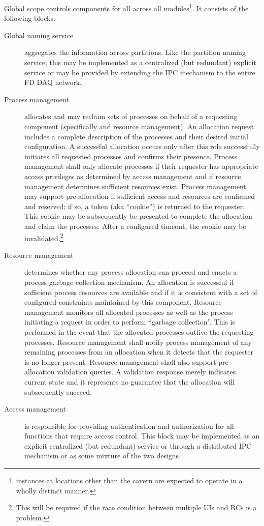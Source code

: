 Global scope controls  components for all  across all  modules\footnote{ instances at locations other than the  cavern are expected to operate in a wholly distinct manner.}.  It consists of the following blocks:


\begin{description}
\item[Global naming service] aggregates the  information across partitions.  Like the partition naming service, this may be implemented as a centralized (but redundant) explicit service or may be provided by extending the IPC  mechanism to the entire FD DAQ network.

\item[Process management] allocates and may reclaim sets of processes on behalf of a requesting component (specifically  and resource management). 
  An allocation request includes a complete description of the processes and their desired initial configuration. 
  A successful allocation occurs only after this role successfully initiates all requested processes and confirms their presence. 
  Process management shall only allocate processes if their requester has appropriate access privileges as determined by access management and if resource management determines sufficient resources exist. 
  Process management may support pre-allocation if sufficient access and resources are confirmed and reserved; if so, a token (aka ``cookie'') is returned to the requester. 
  This cookie may be subsequently be presented to complete the allocation and claim the processes. 
  After a configured timeout, the cookie may be invalidated.\footnote{This will be required if the race condition between multiple UIs and RCs is a problem.}  
  
\item[Resource management] determines whether any process allocation can proceed and enacts a process garbage collection mechanism. 
  An allocation is successful if sufficient process resources are available and if it is consistent with a set of configured constraints maintained by this component. 
  Resource management monitors all allocated processes as well as the process initiating a request in order to perform ``garbage collection''. 
  This is performed in the event that the allocated processes outlive the requesting processes.
  Resource management shall notify process management of any remaining processes from an allocation when it detects that the requester is no longer present.
  Resource management shall also support pre-allocation validation queries. 
  A validation response merely indicates current state and it represents no guarantee that the allocation will subsequently succeed.

  
\item[Access management] is responsible for providing authentication and authorization for all  functions that require access control. 
  This block may be implemented as an explicit centralized (but redundant) service or through a distributed IPC mechanism or as some mixture of the two designs. 

\end{description}


